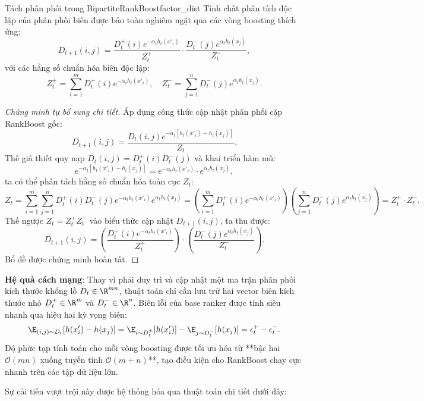 \begin{lemma}{Tách phân phối trong BipartiteRankBoost}{factor_dist}
Tính chất phân tích độc lập của phân phối biên được bảo toàn nghiêm ngặt qua các vòng boosting thích ứng:
\begin{equation}
    D_{t+1}(i, j) = \frac{D^+_t(i) e^{-\alpha_t h_t(x'_i)}}{Z^+_t} \cdot \frac{D^-_t(j) e^{\alpha_t h_t(x_j)}}{Z^-_t},
\end{equation}
với các hằng số chuẩn hóa biên độc lập:
\[
    Z^+_t = \sum_{i=1}^m D^+_t(i) e^{-\alpha_t h_t(x'_i)}, \quad
    Z^-_t = \sum_{j=1}^n D^-_t(j) e^{\alpha_t h_t(x_j)}.
\]
\end{lemma}

\begin{proof}[Chứng minh tự bổ sung chi tiết]
Áp dụng công thức cập nhật phân phối cặp RankBoost gốc:
\[
    D_{t+1}(i, j) = \frac{D_t(i, j) e^{-\alpha_t [h_t(x'_i) - h_t(x_j)]}}{Z_t}.
\]
Thế giả thiết quy nạp $D_t(i,j) = D^+_t(i) D^-_t(j)$ và khai triển hàm mũ:
\[
    e^{-\alpha_t[h_t(x'_i) - h_t(x_j)]} = e^{-\alpha_t h_t(x'_i)} \cdot e^{\alpha_t h_t(x_j)},
\]
ta có thể phân tách hằng số chuẩn hóa toàn cục $Z_t$:
\[
    Z_t = \sum_{i=1}^m \sum_{j=1}^n D^+_t(i) D^-_t(j) e^{-\alpha_t h_t(x'_i)} e^{\alpha_t h_t(x_j)}
    = \left( \sum_{i=1}^m D^+_t(i) e^{-\alpha_t h_t(x'_i)} \right) \left( \sum_{j=1}^n D^-_t(j) e^{\alpha_t h_t(x_j)} \right)
    = Z^+_t \cdot Z^-_t.
\]
Thế ngược $Z_t = Z^+_t Z^-_t$ vào biểu thức cập nhật $D_{t+1}(i,j)$, ta thu được:
\[
    D_{t+1}(i, j) = \left( \frac{D^+_t(i) e^{-\alpha_t h_t(x'_i)}}{Z^+_t} \right) \cdot \left( \frac{D^-_t(j) e^{\alpha_t h_t(x_j)}}{Z^-_t} \right).
\]
Bổ đề được chứng minh hoàn tất.
\end{proof}

\textbf{Hệ quả cách mạng}: Thay vì phải duy trì và cập nhật một ma trận phân phối kích thước khổng lồ $D_t \in \R^{mn}$, thuật toán chỉ cần lưu trữ hai vector biên kích thước nhỏ $D^+_t \in \R^m$ và $D^-_t \in \R^n$. Biên lỗi của base ranker được tính siêu nhanh qua hiệu hai kỳ vọng biên:
\begin{equation}
    \E_{(i,j) \sim D_t}[h(x'_i) - h(x_j)] = \E_{i \sim D^+_t}[h(x'_i)] - \E_{j \sim D^-_t}[h(x_j)] = \epsilon^+_t - \epsilon^-_t.
\end{equation}
Độ phức tạp tính toán cho mỗi vòng boosting được tối ưu hóa từ **bậc hai $\mathcal{O}(mn)$ xuống tuyến tính $\mathcal{O}(m+n)$**, tạo điều kiện cho RankBoost chạy cực nhanh trên các tập dữ liệu lớn.

Sự cải tiến vượt trội này được hệ thống hóa qua thuật toán chi tiết dưới đây:

